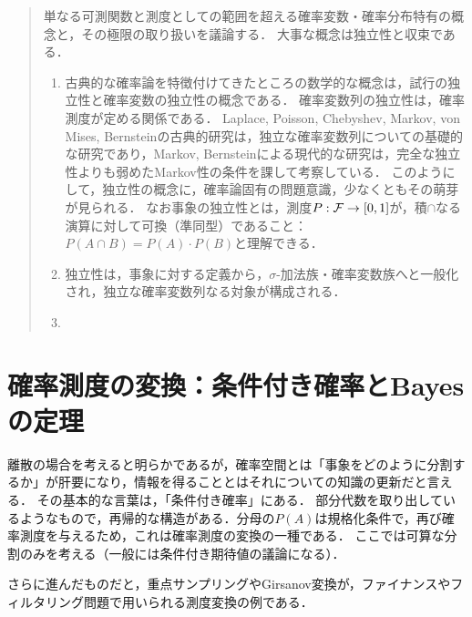 \documentclass[uplatex,dvipdfmx]{jsreport}
\begin{document}
\begin{quotation}
    単なる可測関数と測度としての範囲を超える確率変数・確率分布特有の概念と，その極限の取り扱いを議論する．
    大事な概念は独立性と収束である．
    \begin{enumerate}
        \item 古典的な確率論を特徴付けてきたところの数学的な概念は，試行の独立性と確率変数の独立性の概念である．
        確率変数列の独立性は，確率測度が定める関係である．
        Laplace, Poisson, Chebyshev, Markov, von Mises, Bernsteinの古典的研究は，独立な確率変数列についての基礎的な研究であり，Markov, Bernsteinによる現代的な研究は，完全な独立性よりも弱めたMarkov性の条件を課して考察している．
        このようにして，独立性の概念に，確率論固有の問題意識，少なくともその萌芽が見られる\cite{Kolmogorov}．
        なお事象の独立性とは，測度$P:\mathcal{F}\to[0,1]$が，積$\cap$なる演算に対して可換（準同型）であること：$P(A\cap B)=P(A)\cdot P(B)$と理解できる．
        \item 独立性は，事象に対する定義から，$\sigma$-加法族・確率変数族へと一般化され，独立な確率変数列なる対象が構成される．
        \item 
    \end{enumerate}
\end{quotation}

\section{確率測度の変換：条件付き確率とBayesの定理}

\begin{tcolorbox}[colframe=ForestGreen, colback=ForestGreen!10!white,breakable,colbacktitle=ForestGreen!40!white,coltitle=black,fonttitle=\bfseries\sffamily,
title=確率空間の万華鏡による拡大]
    離散の場合を考えると明らかであるが，確率空間とは「事象をどのように分割するか」が肝要になり，情報を得ることとはそれについての知識の更新だと言える．
    その基本的な言葉は，「条件付き確率」にある．
    部分代数を取り出しているようなもので，再帰的な構造がある．分母の$P(A)$は規格化条件で，再び確率測度を与えるため，これは確率測度の変換の一種である．
    ここでは可算な分割のみを考える（一般には条件付き期待値の議論になる）．

    さらに進んだものだと，重点サンプリングやGirsanov変換が，ファイナンスやフィルタリング問題で用いられる測度変換の例である．
\end{tcolorbox}
\end{document}
